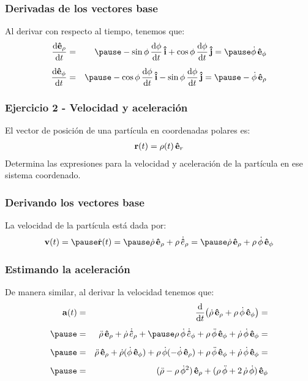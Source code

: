 \documentclass[12pt]{beamer}
\begin{document}
\begin{frame}
\frametitle{Derivadas de los vectores base}
Al derivar con respecto al tiempo, tenemos que:
\begin{eqnarray}
\dv{\vu{e}_{\rho}}{t} &=& \pause - \sin \phi \, \dv{\phi}{t} \, \vu{i} + \cos \phi \, \dv{\phi}{t} \, \vu{j} = \pause \dot{\phi} \, \vu{e}_{\phi} \label{eq:ecuacion_10_02} \\[0.5em]
\dv{\vu{e}_{\phi}}{t} &=& \pause - \cos \phi \, \dv{\phi}{t} \, \vu{i} - \sin \phi \, \dv{\phi}{t} \, \vu{j} = \pause - \dot{\phi} \, \vu{e}_{\rho} \label{eq:ecuacion_10_03}
\end{eqnarray}
\end{frame}
\begin{frame}
\frametitle{Ejercicio 2 - Velocidad y aceleración}
El vector de posición de una partícula en coordenadas polares es:
\begin{align*}
\vb{r} (t) = \rho (t) \, \vu{e}_{r}
\end{align*}
\pause
Determina las expresiones para la velocidad y aceleración de la partícula en ese sistema coordenado.
\end{frame}
\begin{frame}
\frametitle{Derivando los vectores base}
La velocidad de la partícula está dada por:
\begin{eqnarray*}
\vb{v}(t) = \pause \dot{\vb{r}}(t) = \pause \dot{\rho} \, \vu{e}_{\rho} + \rho \, \dot{\vu{e}}_{\rho} = \pause \dot{\rho} \, \vu{e}_{\rho} + \rho \, \dot{\phi} \, \vu{e}_{\phi}
\end{eqnarray*}
\end{frame}
\begin{frame}
\frametitle{Estimando la aceleración}
De manera similar, al derivar la velocidad tenemos que:
\begin{eqnarray*}
\vb{a}(t) &=& \dv{t} \big( \dot{\rho} \, \vu{e}_{\rho} + \rho \, \dot{\phi} \, \vu{e}_{\phi} \big) = \\[0.5em] \pause
&=& \ddot{\rho} \, \vu{e}_{\rho} + \dot{\rho} \, \dot{\vu{e}}_{\rho} + \pause \rho \, \dot{\phi} \, \dot{\vu{e}}_{\phi} + \rho \, \ddot{\phi} \, \vu{e}_{\phi} + \dot{\rho} \, \dot{\phi} \, \vu{e}_{\phi} = \\[0.5em] \pause
&=& \ddot{\rho} \, \vu{e}_{\rho} + \dot{\rho} (\dot{\phi} \, \vu{e}_{\phi}) + \rho \, \dot{\phi} (- \dot{\phi} \, \vu{e}_{\rho}) + \rho \, \ddot{\phi} \, \vu{e}_{\phi} + \dot{\rho} \, \dot{\phi} \, \vu{e}_{\phi} = \\[0.5em] \pause
&=& (\ddot{\rho} - \rho \, \dot{\phi}^{2}) \, \vu{e}_{\rho} + (\rho \, \ddot{\phi} + 2 \, \dot{\rho} \, \dot{\phi}) \, \vu{e}_{\phi}
\end{eqnarray*}
\end{frame}
\end{document}

